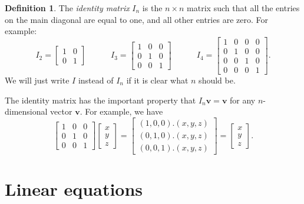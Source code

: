 \documentclass[a4paper]{book}
\newcommand{\PURPLE}[1]{{\color{purple}#1}}
\newcommand{\bbm}       {\begin{bmatrix}}
\newcommand{\ebm}       {\end{bmatrix}}
\newcommand{\tm}        {\times}
\newcommand{\VEC}[1]    {\mathbf{#1}}
\renewcommand{\:}{\colon}
\newcommand{\DEFN}[1]{\PURPLE{\emph{#1}}}
\theoremstyle{definition}
\newtheorem{definition}[theorem]{Definition}
\begin{document}
\begin{definition}
 The \DEFN{identity matrix} $I_n$ is the $n\tm n$ matrix such that all
 the entries on the main diagonal are equal to one, and all other
 entries are zero.  For example:
 {\small \[
  I_2 = \bbm 1&0 \\ 0&1 \ebm \hspace{3em}
  I_3 = \bbm 1&0&0 \\ 0&1&0 \\ 0&0&1 \ebm \hspace{3em}
  I_4 = \bbm 1&0&0&0 \\ 0&1&0&0 \\ 0&0&1&0 \\ 0&0&0&1 \ebm.
 \]}
 We will just write $I$ instead of $I_n$ if it is clear what $n$
 should be.
\end{definition}
The identity matrix has the important property that
$I_n\VEC{v}=\VEC{v}$ for any $n$-dimensional vector $\VEC{v}$.  For
example, we have
\[ \bbm 1&0&0 \\ 0&1&0 \\ 0&0&1 \ebm \bbm x\\ y\\ z\ebm = 
   \bbm (1,0,0).(x,y,z) \\
        (0,1,0).(x,y,z) \\
        (0,0,1).(x,y,z) \ebm = 
   \bbm x \\ y \\ z \ebm.
\]

\section{Linear equations}
\label{sec-linear}
\end{document}

